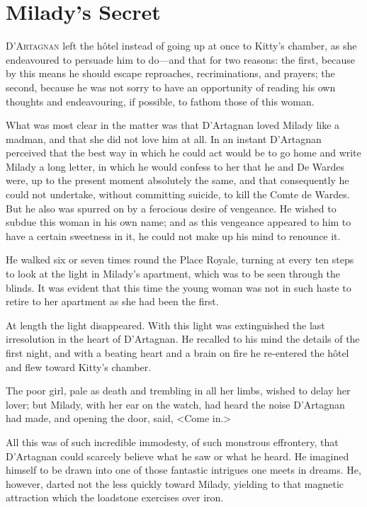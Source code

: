 
\chapter{Milady's Secret} 
	
\lettrine{D}{'Artagnan} left the hôtel instead of going up at once to Kitty's chamber, as she endeavoured to persuade him to do—and that for two reasons: the first, because by this means he should escape reproaches, recriminations, and prayers; the second, because he was not sorry to have an opportunity of reading his own thoughts and endeavouring, if possible, to fathom those of this woman. 

What was most clear in the matter was that D'Artagnan loved Milady like a madman, and that she did not love him at all. In an instant D'Artagnan perceived that the best way in which he could act would be to go home and write Milady a long letter, in which he would confess to her that he and De Wardes were, up to the present moment absolutely the same, and that consequently he could not undertake, without committing suicide, to kill the Comte de Wardes. But he also was spurred on by a ferocious desire of vengeance. He wished to subdue this woman in his own name; and as this vengeance appeared to him to have a certain sweetness in it, he could not make up his mind to renounce it. 

He walked six or seven times round the Place Royale, turning at every ten steps to look at the light in Milady's apartment, which was to be seen through the blinds. It was evident that this time the young woman was not in such haste to retire to her apartment as she had been the first. 

At length the light disappeared. With this light was extinguished the last irresolution in the heart of D'Artagnan. He recalled to his mind the details of the first night, and with a beating heart and a brain on fire he re-entered the hôtel and flew toward Kitty's chamber. 

The poor girl, pale as death and trembling in all her limbs, wished to delay her lover; but Milady, with her ear on the watch, had heard the noise D'Artagnan had made, and opening the door, said, <Come in.> 

All this was of such incredible immodesty, of such monstrous effrontery, that D'Artagnan could scarcely believe what he saw or what he heard. He imagined himself to be drawn into one of those fantastic intrigues one meets in dreams. He, however, darted not the less quickly toward Milady, yielding to that magnetic attraction which the loadstone exercises over iron. 


